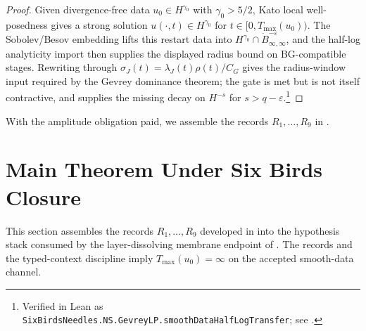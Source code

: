 \documentclass[11pt]{article}
\newcommand{\eps}{\varepsilon}
\newcommand{\Tmax}{T_{\max}}
\newcommand{\CG}{C_G}
\newcommand{\sigmaJ}{\sigma_J}
\newcommand{\lambdaJ}{\lambda_J}
\theoremstyle{definition}
\begin{document}
\begin{proof}
Given divergence-free data \(u_0\in H^{\gamma_0}\) with
\(\gamma_0>5/2\), Kato local well-posedness gives a strong solution
\(u(\cdot,t)\in H^{\gamma_0}\) for \(t\in[0,\Tmax(u_0))\).  The
Sobolev/Besov embedding lifts this restart data into
\(H^{\gamma_0}\cap\dot B^{-\eps}_{\infty,\infty}\), and the half-log
analyticity import then supplies the displayed radius bound on
BG-compatible stages.  Rewriting through
\(\sigmaJ(t)=\lambdaJ(t)\rho(t)/\CG\) gives the radius-window input
required by the Gevrey dominance theorem; the gate is met but is not
itself contractive, and  supplies the
missing decay on \(H^{-s}\) for \(s>q-\eps\).\footnote{Verified in Lean as \texttt{SixBirdsNeedles.NS.GevreyLP.smoothDataHalfLogTransfer}; see .}
\end{proof}

\noindent
With the amplitude obligation paid, we assemble the records
\(R_1,\ldots,R_9\) in .

 

\section{Main Theorem Under Six Birds Closure}
\label{sec:main-theorem}

This section assembles the records \(R_1,\ldots,R_9\) developed in
into the hypothesis stack consumed by the layer-dissolving membrane
endpoint of \citet{Tsiokos2026NeedleKiller}.  The records and the
typed-context discipline imply \(\Tmax(u_0)=\infty\) on the accepted
smooth-data channel.
\end{document}
